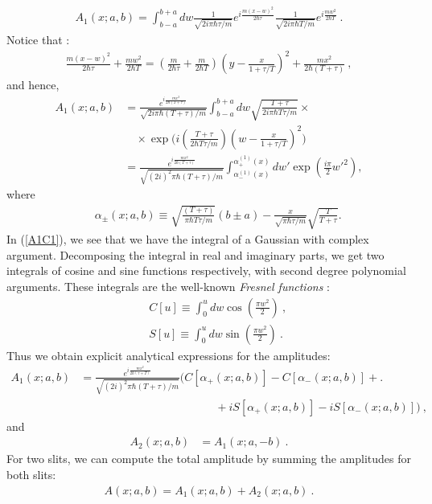 \documentclass[12pt]{article}   %
\begin{document}
\begin{eqnarray}\label{A11}
A_1(x;a,b)=\int_{b-a}^{b+a} dw \frac{1}{\sqrt{2i\pi
\hbar\tau/m}}e^{i\frac{m (x-w)^2}{2\hbar\tau}}
\frac{1}{\sqrt{2i\pi \hbar T/m}}e^{i\frac{m w^2}{2\hbar T}}  \ .
\end{eqnarray}
Notice that :
\begin{eqnarray*}
\frac{m(x-w)^2}{2\hbar\tau}+\frac{mw^2}{2\hbar T}=
(\frac{m}{2\hbar\tau}+\frac{m}{2\hbar
T})(y-\frac{x}{1+\tau/T})^2 + \frac{mx^2}{2\hbar(T+\tau)}\ ,
\end{eqnarray*}
and hence,
\begin{align}\label{A1C1}
A_1(x;a,b)&=\frac{e^{i\frac{mx^2}{2\hbar
(T+\tau)}}}{\sqrt{2i\pi \hbar (T+\tau)/m}}\int_{b-a}^{b+a} dw
\sqrt{\frac{T+\tau}{2i\pi \hbar
T\tau/m}}\times \nonumber \\
&\quad \times \exp{\bigl(i(\frac{T+\tau}{2\hbar
T\tau/m})(w-\frac{x}{1+\tau/T})^2\bigr)}
{}\nonumber\\{}&=\frac{e^{i\frac{mx^2}{2\hbar
(T+\tau)}}}{\sqrt{(2i)^2\pi \hbar
(T+\tau)/m}}\int_{\alpha_{-}^{(1)}(x)}^{\alpha_{+}^{(1)}(x)} dw'
\exp{\left(\frac{i\pi}{2} w'^2\right)},
\end{align}
where
\begin{eqnarray}\label{alpha1}
&&\alpha_{\pm}(x;a,b)\equiv\sqrt{\frac{(T+\tau)}{\pi \hbar
T\tau/m}}(b\pm a)-\frac{x}{\sqrt{\pi
\hbar\tau/m}}\sqrt{\frac{T}{T+\tau}}.
\end{eqnarray}
In (\ref{A1C1}), we see that we have the integral of a Gaussian
with complex argument. Decomposing the integral in real and
imaginary parts, we get two integrals of cosine and sine functions
respectively, with second degree polynomial arguments. These
integrals are the well-known \textit{Fresnel functions}
\cite{Abramowitz}:
\begin{eqnarray*}
&& C[u]\equiv\int_0^u dw \cos{(\frac{\pi w^2}{2})}\ , {}\\{}&&
S[u]\equiv\int_0^u dw \sin{(\frac{\pi w^2}{2})}\ .
\end{eqnarray*}
Thus we obtain explicit analytical expressions for the amplitudes:
\begin{align}\label{A1C2}
 A_1(x;a,b)&=\frac{e^{i\frac{m x^2}{2\hbar
(\tau+T)}}}{\sqrt{(2i)^2\pi \hbar (T+\tau)/m}}\bigl(C[\alpha_{+}(x;a,b)] - C[\alpha_{-}(x;a,b)] +\bigr. \nonumber\\
& \qquad\qquad\qquad\qquad\qquad\qquad + iS[\alpha_{+}(x;a,b)] - iS[\alpha_{-}(x;a,b)] \bigr)\ ,
\end{align}
and
\begin{align}\label{A2C2}
A_2(x;a,b)&=A_1(x;a,-b)\ .
\end{align}
{For two slits, we can compute the total amplitude by summing the amplitudes for both slits:
\begin{eqnarray}\label{A}
A(x;a,b)=A_1(x;a,b)+A_2(x;a,b)\ .
\end{eqnarray}}
\end{document}
